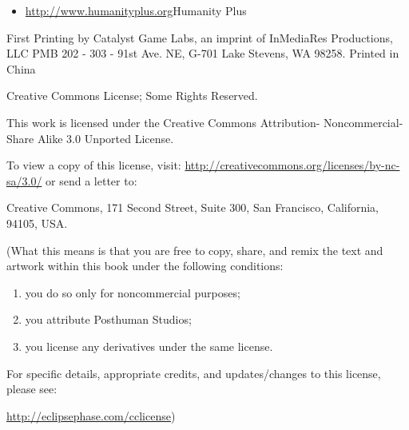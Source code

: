\begin{itemize} \item \url{http://www.humanityplus.org}{Humanity Plus} \end{itemize} 

First Printing by Catalyst Game Labs, an imprint of InMediaRes Productions, LLC PMB 202 - 303 - 91st Ave. NE, G-701 Lake Stevens, WA 98258. Printed in China 

Creative Commons License; Some Rights Reserved. 

This work is licensed under the Creative Commons Attribution- Noncommercial-Share Alike 3.0 Unported License. 

To view a copy of this license, visit: \url{http://creativecommons.org/licenses/by-nc-sa/3.0/}{} or send a letter to: 

\begin{center} Creative Commons, 171 Second Street, Suite 300, San Francisco, California, 94105, USA. \end{center} 

(What this means is that you are free to copy, share, and remix the text and artwork within this book under the following conditions: 

\begin{enumerate} \item you do so only for noncommercial purposes; \item you attribute Posthuman Studios; \item you license any derivatives under the same license. \end{enumerate} 

For specific details, appropriate credits, and updates/changes to this license, please see: 

\begin{center} \url{http://eclipsephase.com/cclicense}{}) \end{center} 











